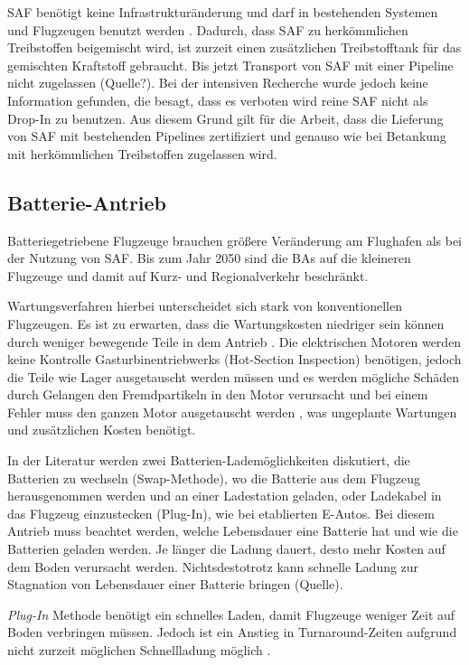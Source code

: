 SAF benötigt keine Infrastrukturänderung und darf in bestehenden Systemen und Flugzeugen benutzt werden \cite{dalmia2022powering}.
Dadurch, dass SAF zu herkömmlichen Treibstoffen beigemischt wird, ist zurzeit einen zusätzlichen Treibstofftank 
für das gemischten Kraftstoff gebraucht. Bis jetzt Transport von SAF mit einer Pipeline nicht zugelassen (Quelle?).
Bei der intensiven Recherche wurde jedoch keine Information gefunden, die besagt, dass es verboten wird reine SAF nicht als
Drop-In zu benutzen. Aus diesem Grund gilt für die Arbeit, dass die Lieferung von SAF mit bestehenden Pipelines 
zertifiziert und genauso wie bei Betankung mit herkömmlichen Treibstoffen zugelassen wird.

\subsection{Batterie-Antrieb}
Batteriegetriebene Flugzeuge brauchen größere Veränderung am Flughafen als bei der Nutzung von SAF.
Bis zum Jahr 2050 sind die BAs auf die kleineren Flugzeuge und damit auf Kurz- und Regionalverkehr beschränkt. 

Wartungsverfahren hierbei unterscheidet sich stark von konventionellen Flugzeugen. 
Es ist zu erwarten, dass die Wartungskosten niedriger sein können durch weniger bewegende Teile in dem Antrieb \cite{dalmia2022powering}. 
%
Die elektrischen Motoren werden keine Kontrolle Gasturbinentriebwerks (Hot-Section Inspection) benötigen, 
jedoch die Teile wie Lager ausgetauscht werden müssen und 
es werden mögliche Schäden durch Gelangen den Fremdpartikeln in den Motor verursacht \cite{reimers2018introduction} 
und bei einem Fehler muss den ganzen Motor ausgetauscht werden \cite{dalmia2022powering}, was ungeplante
Wartungen und zusätzlichen Kosten benötigt.

In der Literatur werden zwei Batterien-Lademöglichkeiten diskutiert, die Batterien zu wechseln (Swap-Methode), 
wo die Batterie aus dem Flugzeug herausgenommen werden und 
an einer Ladestation geladen, oder Ladekabel in das Flugzeug einzustecken (Plug-In), wie bei etablierten E-Autos.
%
Bei diesem Antrieb muss beachtet werden, welche Lebensdauer eine Batterie hat und wie die Batterien geladen werden. 
Je länger die Ladung dauert, desto mehr Kosten auf dem Boden verursacht werden. Nichtsdestotrotz kann schnelle Ladung 
zur Stagnation von Lebensdauer einer Batterie bringen (Quelle).

\textit{Plug-In} Methode benötigt ein schnelles Laden, damit Flugzeuge weniger Zeit auf Boden verbringen müssen.
Jedoch ist ein Anstieg in Turnaround-Zeiten aufgrund nicht zurzeit möglichen Schnellladung möglich \cite{avogadro2024demystifying}.

